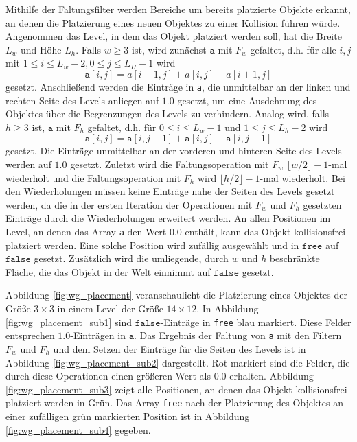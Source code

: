Mithilfe der Faltungsfilter werden Bereiche um bereits platzierte Objekte erkannt, an denen die Platzierung eines neuen Objektes zu einer Kollision führen würde. Angenommen das Level, in dem das Objekt platziert werden soll, hat die Breite $L_w$ und Höhe $L_h$. Falls $w\ge 3$ ist, wird zunächst $\texttt{a}$ mit $F_w$ gefaltet, d.h. für alle $i,j$ mit $1 \le i \le L_w-2, 0\le j\le L_H - 1$ wird \[\texttt{a}[i,j] = a[i-1,j] +  a[i,j] + a[i+1,j]\] gesetzt. Anschließend werden die Einträge in \texttt{a}, die unmittelbar an der linken und rechten Seite des Levels anliegen auf $1.0$ gesetzt, um eine Ausdehnung des Objektes über die Begrenzungen des Levels zu verhindern. Analog wird, falls $h\ge 3$ ist, $\texttt{a}$ mit $F_h$ gefaltet, d.h. für $0\le i\le L_w-1$ und $1\le j\le L_h-2$ wird \[\texttt{a}[i,j] = \texttt{a}[i,j-1] + \texttt{a}[i,j] + \texttt{a}[i,j+1]\] gesetzt. Die Einträge unmittelbar an der vorderen und hinteren Seite des Levels werden auf $1.0$ gesetzt. Zuletzt wird die Faltungsoperation mit $F_w$ $\lfloor w/2\rfloor-1$-mal wiederholt und die Faltungsoperation mit $F_h$ wird $\lfloor h/2\rfloor-1$-mal wiederholt. Bei den Wiederholungen müssen keine Einträge nahe der Seiten des Levels gesetzt werden, da die in der ersten Iteration der Operationen mit $F_w$ und $F_h$ gesetzten Einträge durch die Wiederholungen erweitert werden. An allen Positionen im Level, an denen das Array  \texttt{a} den Wert $0.0$ enthält, kann das Objekt kollisionsfrei platziert werden. Eine solche Position wird zufällig ausgewählt und in $\texttt{free}$ auf $\texttt{false}$ gesetzt. Zusätzlich wird die umliegende, durch $w$ und $h$ beschränkte Fläche, die das Objekt in der Welt einnimmt auf $\texttt{false}$ gesetzt.

Abbildung \ref{fig:wg_placement} veranschaulicht die Platzierung eines Objektes der Größe $3\times 3$ in einem Level der Größe $14\times 12$. In Abbildung \ref{fig:wg_placement_sub1} sind $\texttt{false}$-Einträge in \texttt{free} blau markiert. Diese Felder entsprechen $1.0$-Einträgen in $\texttt{a}$. Das Ergebnis der Faltung von \texttt{a} mit den Filtern $F_w$ und $F_h$ und dem Setzen der Einträge für die Seiten des Levels ist in Abbildung \ref{fig:wg_placement_sub2} dargestellt. Rot markiert sind die Felder, die durch diese Operationen einen größeren Wert als $0.0$ erhalten. Abbildung \ref{fig:wg_placement_sub3} zeigt alle Positionen, an denen das Objekt kollisionsfrei platziert werden in Grün. Das Array \texttt{free} nach der Platzierung des Objektes an einer zufälligen grün markierten Position ist in Abbildung \ref{fig:wg_placement_sub4} gegeben.

